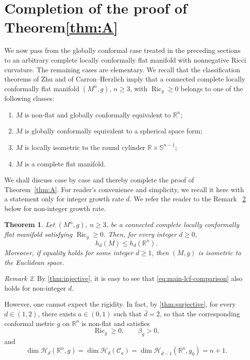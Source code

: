 \documentclass[12pt]{amsart}
\theoremstyle{plain}
\newtheorem{theorem}{Theorem}[section]
\theoremstyle{definition}
\theoremstyle{remark}     %
\newtheorem{remark}[theorem]{Remark}
\numberwithin{equation}{section}
\begin{document}
\section{Completion of the proof of Theorem\ref{thm:A}}
\label{sec:completion-lcf}

We now pass from the globally conformal case treated in the preceding
sections to an arbitrary complete locally conformally flat manifold with nonnegative Ricci curvature.  The remaining cases are elementary. We recall that the classification theorems of Zhu \cite[Theorem 1]{Z} and of
Carron--Herzlich \cite[Theorem A]{CH} imply that a connected complete locally conformally flat
manifold $(M^n,g)$, $n\geq3$, with $\operatorname{Ric}_g\geq0$ belongs to
one of the following classes:
\begin{enumerate}
\item $M$ is non-flat and globally conformally equivalent to $\mathbb R^n$;
\item $M$ is globally conformally equivalent to a spherical space form;
\item $M$ is locally isometric to the round cylinder
      $\mathbb R\times\mathbb S^{n-1}$;
\item $M$ is a complete flat manifold.
\end{enumerate}


We shall discuss case by case and thereby complete the proof of Theorem~\ref{thm:A}. For reader's convenience and simplicity, we recall it here with a statement only for integer growth rate $d$. We refer the reader to the Remark ~\ref{rem:noninteger} below for non-integer growth rate. 
\begin{theorem}
\label{thm:main-lcf-comparison}
Let $(M^n,g)$, $n\geq3$, be a connected complete locally conformally flat
manifold satisfying $\operatorname{Ric}_g\geq0$.  Then, for every integer
$d\geq0$,
\begin{equation}\label{eq:main-lcf-comparison}
    h_d(M)\leq h_d(\mathbb R^n).
\end{equation}
Moreover, if equality holds for some integer $d\geq1$, then $(M,g)$ is
isometric to the Euclidean space. 
\end{theorem}

\begin{remark} \label{rem:noninteger}
By \cref{thm:injective}, it is easy to see that  \cref{eq:main-lcf-comparison} also holds for non-integer $d$. 


However, one cannot expect the rigidity. In fact, by \cref{thm:surjective}, 
 for every $d\in(1,2)$, there exists $a\in(0,1)$ such that $\bar{d}=2$, so that the corresponding conformal metric $g$ on $\mathbb{R}^n$ is non-flat and satisfies 
\[
\operatorname{Ric}_g\geq 0,
\qquad
\beta_g>0,
\]
and
\[
\dim \mathcal H_d(\mathbb R^n,g)
=\dim \mathcal{H}_{d}(\mathcal{C}_a)=
\dim \mathcal H_{\bar{d}-1}(\mathbb R^n,g_0)
=
n+1.
\]
\end{remark}
\end{document}
